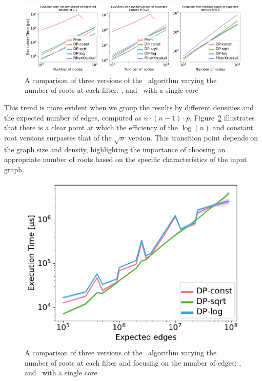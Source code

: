     \begin{figure}[H]
    \begin{center}
        \includegraphics[width=\textwidth]{figures/SomeDensities_mixed.pdf}
    \end{center}
    \caption{A comparison of three versions of the \DPmst\ algorithm varying the number of roots at each filter: ,  and \ with a single core\label{fig:Fsize_comparison}}
    \end{figure}

    This trend is more evident when we group the results by different densities and the expected number of edges, computed as $n \cdot (n-1) \cdot p$. Figure~\ref{fig:Fsize_comparison_edges} illustrates that there is a clear point at which the efficiency of the $\log(n)$ and constant root versions surpasses that of the $\sqrt{n}$ version. This transition point depends on the graph size and density, highlighting the importance of choosing an appropriate number of roots based on the specific characteristics of the input graph.

    \begin{figure}
        \centering
        \includegraphics[width=0.7\linewidth]{figures/FilterSizeExpectedEdges.pdf}
        \caption{A comparison of three versions of the \DPmst\ algorithm varying the number of roots at each filter and focusing on the number of edges: ,  and \ with a single core\label{fig:Fsize_comparison_edges}}
    \end{figure}

